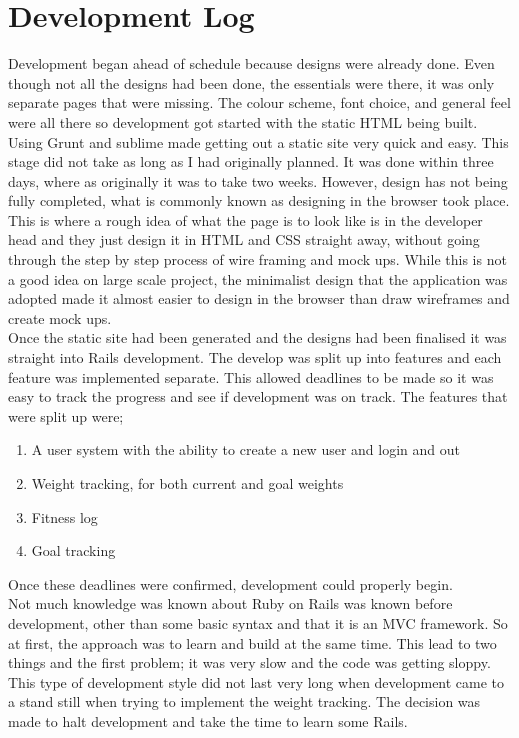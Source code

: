 \section{Development Log}
Development began ahead of schedule because designs were already done. Even though not all the designs had been done, the essentials were there, it was only separate pages that were missing. The colour scheme, font choice, and general feel were all there so development got started with the static HTML being built. Using Grunt \citep{grunt:2013} and sublime made getting out a static site very quick and easy. This stage did not take as long as I had originally planned. It was done within three days, where as originally it was to take two weeks. However, design has not being fully completed, what is commonly known as designing in the browser took place. This is where a rough idea of what the page is to look like is in the developer head and they just design it in HTML and CSS straight away, without going through the step by step process of wire framing and mock ups. While this is not a good idea on large scale project, the minimalist design that the application was adopted made it almost easier to design in the browser than draw wireframes and create mock ups.\\

Once the static site had been generated and the designs had been finalised it was straight into Rails development. The develop was split up into features and each feature was implemented separate. This allowed deadlines to be made so it was easy to track the progress and see if development was on track. The features that were split up were;

\begin{enumerate}
\item A user system with the ability to create a new user and login and out
\item Weight tracking, for both current and goal weights
\item Fitness log
\item Goal tracking
\end{enumerate}

\noindent
Once these deadlines were confirmed, development could properly begin.\\

Not much knowledge was known about Ruby on Rails was known before development, other than some basic syntax and that it is an MVC framework. So at first, the approach was to learn and build at the same time. This lead to two things and the first problem; it was very slow and the code was getting sloppy. This type of development style did not last very long when development came to a stand still when trying to implement the weight tracking. The decision was made to halt development and take the time to learn some Rails.\\

